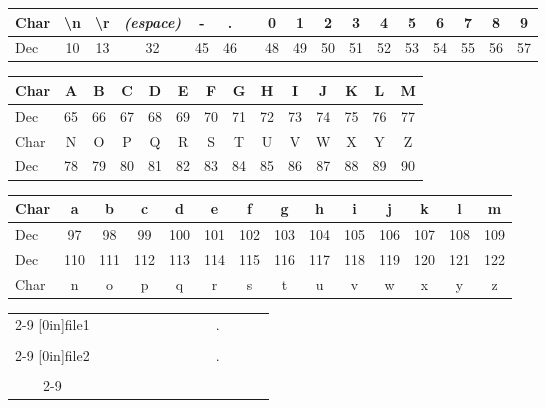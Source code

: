 \documentclass[11pt,a4paper]{article}
\begin{document}
\begin{center}
\begin{tabular}{ | l |c|c|c|c|c| c |c|c|c|c|c|c|c|c|c|c| }
\hline
Char & \textbackslash{}n & \textbackslash{}r & { \small \textit{(espace)} } &  - &  . &   & 0 &  1 &  2 &  3 &  4 &  5 &  6 &  7 &  8 &  9 \\
\hline
Dec &         10         &        13         &         32        & 45 & 46 &   & 48 & 49 & 50 & 51 & 52 & 53 & 54 & 55 & 56 & 57 \\
\hline
\end{tabular}

\medskip

\begin{tabular}{ | l |c|c|c|c|c|c|c|c|c|c|c|c|c| }
\hline
Char &  A &  B &  C &  D &  E &  F &  G &  H &  I &  J &  K &  L &  M \\
\hline
Dec &  65 & 66 & 67 & 68 & 69 & 70 & 71 & 72 & 73 & 74 & 75 & 76 & 77 \\
\hline
\hline
Char &  N &  O &  P &  Q &  R &  S &  T &  U &  V &  W &  X &  Y &  Z \\
\hline
Dec &  78 & 79 & 80 & 81 & 82 & 83 & 84 & 85 & 86 & 87 & 88 & 89 & 90 \\
\hline
\end{tabular}

\medskip

\begin{tabular}{ | l |c|c|c|c|c|c|c|c|c|c|c|c|c| }
\hline
Char &  a &  b &  c &  d  &  e  &  f  &  g  &  h  &  i  &  j  &  k  &  l  &  m \\
\hline
Dec &  97 & 98 & 99 & 100 & 101 & 102 & 103 & 104 & 105 & 106 & 107 & 108 & 109 \\
\hline
\hline
Dec &  110 & 111 & 112 & 113 & 114 & 115 & 116 & 117 & 118 & 119 & 120 & 121 & 122 \\
\hline
Char &  n  &  o  &  p  &  q  &  r  &  s  &  t  &  u  &  v  &  w  &  x  &  y  &  z \\
\hline
\end{tabular}

\bigskip

\begin{tabular}{ c   | m{0.45cm} | m{0.45cm} | m{0.45cm} | m{0.45cm} | m{0.45cm} | m{0.45cm} | m{0.45cm} | m{0.45cm} | c | m{0.45cm} | m{0.45cm} | m{0.45cm} | }
\cline{2-9} \cline{11-13}
\multirow[r]{2}{*}[0in]{file1} & & & & & & & & &  \multirow[c]{2}{*}[0in]{.}  & & & \\
 & & & & & & & & &   & & & \\
\cline{2-9} \cline{11-13}
\multirow[r]{2}{*}[0in]{file2} & & & & & & & & &  \multirow[c]{2}{*}[0in]{.}  & & & \\
 & & & & & & & & &   & & & \\
\cline{2-9} \cline{11-13}
\end{tabular}

\end{center}
\end{document}
